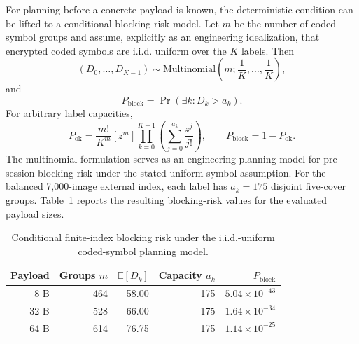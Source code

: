 For planning before a concrete payload is known, the deterministic condition can be lifted to a conditional blocking-risk model. Let $m$ be the number of coded symbol groups and assume, explicitly as an engineering idealization, that encrypted coded symbols are i.i.d. uniform over the $K$ labels. Then
\begin{equation}
(D_0,\ldots,D_{K-1})\sim\mathrm{Multinomial}\!\left(m;\frac{1}{K},\ldots,\frac{1}{K}\right),
\end{equation}
and
\begin{equation}
P_{\mathrm{block}}=\Pr(\exists k:D_k>a_k).
\end{equation}
For arbitrary label capacities,
\begin{equation}
P_{\mathrm{ok}}=\frac{m!}{K^m}[z^m]\prod_{k=0}^{K-1}\left(\sum_{j=0}^{a_k}\frac{z^j}{j!}\right),\qquad P_{\mathrm{block}}=1-P_{\mathrm{ok}}.
\end{equation}
The multinomial formulation serves as an engineering planning model for pre-session blocking risk under the stated uniform-symbol assumption. For the balanced 7,000-image external index, each label has $a_k=175$ disjoint five-cover groups. Table~\ref{tab:blockrisk} reports the resulting blocking-risk values for the evaluated payload sizes.
\begin{table}[!htbp]
\caption{Conditional finite-index blocking risk under the i.i.d.-uniform coded-symbol planning model.}
\label{tab:blockrisk}
\small
\begin{tabular}{rrrrr}
\toprule
Payload & Groups $m$ & $\mathbb{E}[D_k]$ & Capacity $a_k$ & $P_{\mathrm{block}}$\\
\midrule
8 B & 464 & 58.00 & 175 & $5.04\times10^{-43}$\\
32 B & 528 & 66.00 & 175 & $1.64\times10^{-34}$\\
64 B & 614 & 76.75 & 175 & $1.14\times10^{-25}$\\
\bottomrule
\end{tabular}
\end{table}

